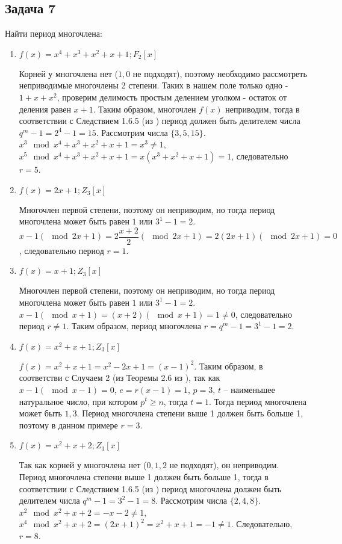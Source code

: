 \documentclass[utf8x, 14pt]{G7-32} %
\begin{document}
\subsection{Задача 7}
Найти период многочлена:
\begin{enumerate}
    \item $f(x)=x^4+x^3+x^2+x+1; F_2[x]$
    
    Корней у многочлена нет ($1,0$ не подходят), поэтому необходимо рассмотреть неприводимые многочлены 2 степени. Таких в нашем поле только одно - $1 + x + x^2$, проверим делимость простым делением уголком - остаток от деления равен $x+1$. Таким образом, многочлен $f(x)$ неприводим, тогда в соответствии с Следствием 1.6.5 (из \cite{hse:Teoria_Gener}) период должен быть делителем числа $ q^m -1 = 2^4 - 1 = 15$. Рассмотрим числа $\{3, 5, 15\}$. $x^3 \mod x^4+x^3+x^2+x+1 = x^3 \neq 1$, $x^5 \mod x^4+x^3+x^2+x+1 = x(x^3+x^2+x+1) = 1$, следовательно $r= 5$.

    \item $f(x)=2x+1; Z_3[x]$
    
    Многочлен первой степени, поэтому он неприводим, но тогда период многочлена может быть равен $1$ или $3^1-1 = 2$. $x -1 (\mod{2x + 1}) = 2\dfrac{x + 2}{2} (\mod{2x + 1}) = 2(2x + 1) (\mod{2x + 1}) = 0$, следовательно период $r = 1$.
    
    \item $f(x)=x+1; Z_3[x]$ \label{ex31}
    
    Многочлен первой степени, поэтому он неприводим, но тогда период многочлена может быть равен $1$ или $3^1-1 = 2$. $x - 1 (\mod{x + 1}) = (x + 2) (\mod{x + 1}) = 1 \neq 0$, следовательно период $r \neq 1$. Таким образом, период многочлена $r = q^m -1 = 3^1 -1 = 2$.
    
    \item $f(x)=x^2+x+1; Z_3[x]$
    
    $f(x) = x^2 + x + 1 = x^2 -2x +1 = (x - 1)^2$. Таким образом, в соответстви с Случаем 2 (из Теоремы 2.6 из \cite{hse:Teoria_Gener}), так как $x - 1 (\mod{x - 1}) = 0$, $e = r(x-1) = 1$, $p = 3$, $t$ – наименьшее натуральное число, при котором $p^t\geq n$, тогда $t = 1$. Тогда период многочлена может быть ${1, 3}$. Период многочлена степени выше 1 должен быть больше 1, поэтому в данном примере $r = 3$.

    \item $f(x)=x^2+x+2; Z_3[x]$ \label{ex3}
    
    Так как корней у многочлена нет ($0,1,2$ не подходят), он неприводим. Период многочлена степени выше 1 должен быть больше 1, тогда в соответствии с Следствием 1.6.5 (из \cite{hse:Teoria_Gener}) период многочлена должен быть делителем числа $q^m -1 = 3^2 -1 = 8$. Рассмотрим числа $\{2, 4, 8\}$. $x^2 \mod x^2 + x +2 = - x - 2 \neq 1$,  $x^4 \mod x^2 + x +2 = (2x + 1)^2 = x^2 + x + 1 = - 1 \neq 1$. Следовательно, $r=8$.


\end{enumerate}
\end{document}
